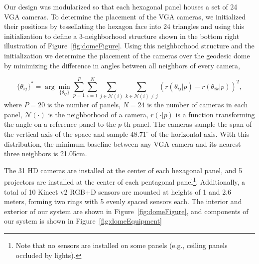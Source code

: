 	Our design was modularized so that each hexagonal panel houses a set of 24 VGA cameras. To determine the placement of the VGA cameras, we initialized their positions by tessellating the hexagon face into 24 triangles and using this initialization to define a 3-neighborhood structure shown in the bottom right illustration of Figure~\ref{fig:domeFigure}. Using this neighborhood structure and the initialization we determine the placement of the cameras over the geodesic dome by minimizing the difference in angles between all neighbors of every camera,
	
	{\small
		\begin{equation}\nonumber
		\{\theta_{ij}\}^* = \arg \min_{\{\theta_{ij}\}} \sum_{p=1}^P \sum_{i=1}^{N} \sum_{j \in \mathcal{N}(i)}  \sum_{k \in \mathcal{N}(i) \neq j}  (r(\theta_{ij}|p)-r(\theta_{ik}|p))^2 ,
		\end{equation}
	}where $P=20$ is the number of panels, $N=24$ is the number of cameras in each panel, $\mathcal{N}(\cdot)$ is the neighborhood of a camera, $r(\cdot|p)$ is a function transforming the angle on a reference panel to the $p$-th panel. The cameras sample the span of the vertical axis of the space and sample $48.71^\circ$ of the horizontal axis. With this distribution, the minimum baseline between any VGA camera and its nearest three neighbors is 21.05cm. 
		
	The 31 HD cameras are installed at the center of each hexagonal panel, and 5 projectors are installed at the center of each pentagonal panel\footnote{Note that no sensors are installed on some panels (e.g., ceiling panels occluded by lights).}. Additionally, a total of 10 Kinect v2 RGB+D sensors are mounted at heights of 1 and 2.6 meters, forming two rings with 5 evenly spaced sensors each. The interior and exterior of our system are shown in Figure~\ref{fig:domeFigure}, and components of our system is shown in Figure~\ref{fig:domeEquipment}
	
